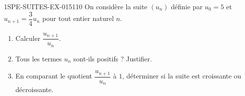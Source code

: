 \begin{exercice}{1SPE-SUITES-EX-015}{1}{10}
On considère la suite $(u_n)$ définie par $u_0 = 5$ et $u_{n+1} = \dfrac{3}{4} u_n$ pour tout entier naturel $n$.
\begin{enumerate}
  \item Calculer $\dfrac{u_{n+1}}{u_n}$.
  \item Tous les termes $u_n$ sont-ils positifs ? Justifier.
  \item En comparant le quotient $\dfrac{u_{n+1}}{u_n}$ à $1$, déterminer si la suite est croissante ou décroissante.
\end{enumerate}
\end{exercice}
